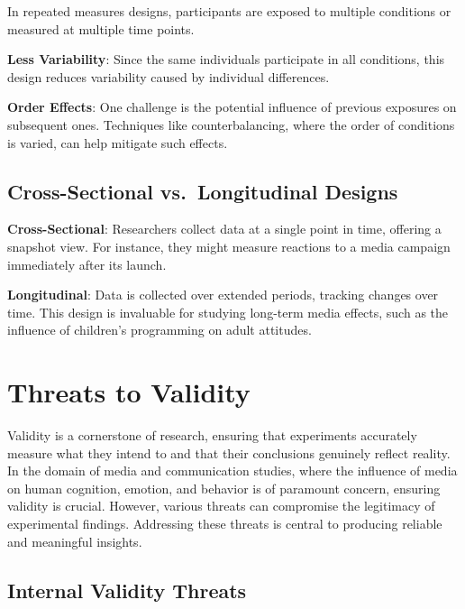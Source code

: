 \documentclass[
  b5paper]{book}
\begin{document}
In repeated measures designs, participants are exposed to multiple conditions or measured at multiple time points.

\textbf{Less Variability}: Since the same individuals participate in all conditions, this design reduces variability caused by individual differences.

\textbf{Order Effects}: One challenge is the potential influence of previous exposures on subsequent ones. Techniques like counterbalancing, where the order of conditions is varied, can help mitigate such effects.

\hypertarget{cross-sectional-vs.-longitudinal-designs}{%
\subsection*{Cross-Sectional vs.~Longitudinal Designs}\label{cross-sectional-vs.-longitudinal-designs}}

\textbf{Cross-Sectional}: Researchers collect data at a single point in time, offering a snapshot view. For instance, they might measure reactions to a media campaign immediately after its launch.

\textbf{Longitudinal}: Data is collected over extended periods, tracking changes over time. This design is invaluable for studying long-term media effects, such as the influence of children's programming on adult attitudes.

\hypertarget{threats-to-validity}{%
\section{Threats to Validity}\label{threats-to-validity}}

Validity is a cornerstone of research, ensuring that experiments accurately measure what they intend to and that their conclusions genuinely reflect reality. In the domain of media and communication studies, where the influence of media on human cognition, emotion, and behavior is of paramount concern, ensuring validity is crucial. However, various threats can compromise the legitimacy of experimental findings. Addressing these threats is central to producing reliable and meaningful insights.

\hypertarget{internal-validity-threats}{%
\subsection*{Internal Validity Threats}\label{internal-validity-threats}}
\end{document}
